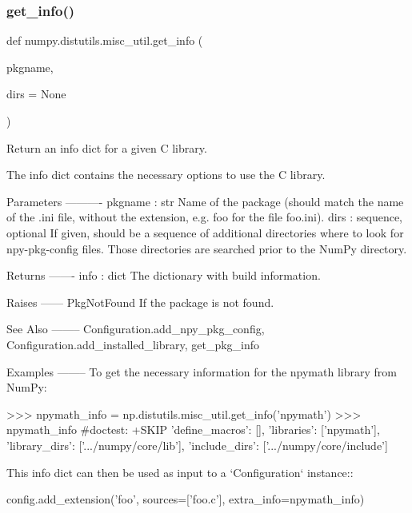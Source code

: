 \subsubsection{\texorpdfstring{get\+\_\+info()}{get\_info()}}
{\footnotesize\ttfamily def numpy.\+distutils.\+misc\+\_\+util.\+get\+\_\+info (\begin{DoxyParamCaption}\item[{}]{pkgname,  }\item[{}]{dirs = {\ttfamily None} }\end{DoxyParamCaption})}

\begin{DoxyVerb}Return an info dict for a given C library.

The info dict contains the necessary options to use the C library.

Parameters
----------
pkgname : str
    Name of the package (should match the name of the .ini file, without
    the extension, e.g. foo for the file foo.ini).
dirs : sequence, optional
    If given, should be a sequence of additional directories where to look
    for npy-pkg-config files. Those directories are searched prior to the
    NumPy directory.

Returns
-------
info : dict
    The dictionary with build information.

Raises
------
PkgNotFound
    If the package is not found.

See Also
--------
Configuration.add_npy_pkg_config, Configuration.add_installed_library,
get_pkg_info

Examples
--------
To get the necessary information for the npymath library from NumPy:

>>> npymath_info = np.distutils.misc_util.get_info('npymath')
>>> npymath_info                                    #doctest: +SKIP
{'define_macros': [], 'libraries': ['npymath'], 'library_dirs':
['.../numpy/core/lib'], 'include_dirs': ['.../numpy/core/include']}

This info dict can then be used as input to a `Configuration` instance::

  config.add_extension('foo', sources=['foo.c'], extra_info=npymath_info)\end{DoxyVerb}
 \mbox{\label{namespacenumpy_1_1distutils_1_1misc__util_a29883d80dda29923faebef5e0f9910fc}} 
